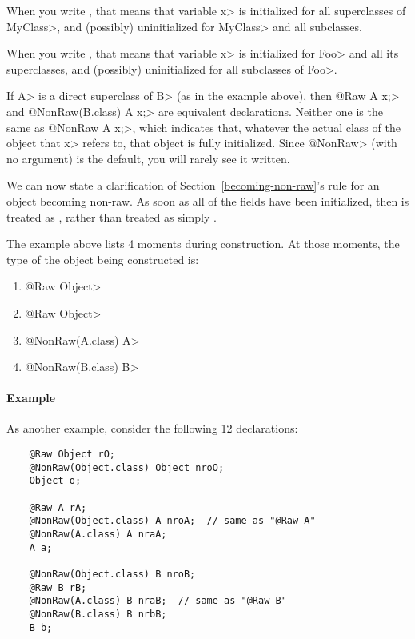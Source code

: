 When you write , that
means that variable \<x> is initialized for all superclasses of \<MyClass>,
and (possibly) uninitialized for \<MyClass> and all subclasses.

When you write , that means that variable \<x> is initialized for \<Foo> and all its
superclasses, and (possibly) uninitialized for all subclasses of \<Foo>.

If \<A> is a direct superclass of \<B> (as in the example above), then 
\<@Raw A x;> and \<@NonRaw(B.class) A x;> are equivalent declarations.
Neither one is the same as \<@NonRaw A x;>, which indicates that, whatever
the actual class of the object that \<x> refers to, that object is fully
initialized.  Since \<@NonRaw> (with no argument) is the default, you will
rarely see it written.

\label{becoming-non-raw-clarification}

We can now state a clarification of Section~\ref{becoming-non-raw}'s rule
for an object becoming non-raw.
As soon as all of the  fields
have been initialized, then  is treated as
, rather than
treated as simply 
.

The example above lists 4 moments during construction.  At those moments,
the type of the object being constructed is:

\begin{enumerate}
\item
  \<@Raw Object>
\item
  \<@Raw Object>
\item
  \<@NonRaw(A.class) A>
\item
  \<@NonRaw(B.class) B>
\end{enumerate}

\paragraph{Example}

As another example, consider the following 12 declarations:

\begin{Verbatim}
    @Raw Object rO;
    @NonRaw(Object.class) Object nroO;
    Object o;

    @Raw A rA;
    @NonRaw(Object.class) A nroA;  // same as "@Raw A"
    @NonRaw(A.class) A nraA;
    A a;

    @NonRaw(Object.class) B nroB;
    @Raw B rB;
    @NonRaw(A.class) B nraB;  // same as "@Raw B"
    @NonRaw(B.class) B nrbB;
    B b;
\end{Verbatim}

